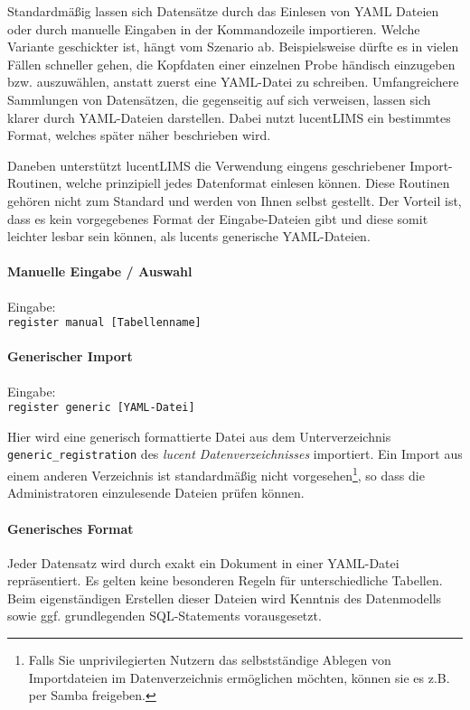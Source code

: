 Standardmäßig lassen sich Datensätze durch das Einlesen von YAML Dateien oder durch manuelle Eingaben in der Kommandozeile importieren.
Welche Variante geschickter ist, hängt vom Szenario ab.
Beispielsweise dürfte es in vielen Fällen schneller gehen, die Kopfdaten einer einzelnen Probe händisch einzugeben bzw. auszuwählen, anstatt zuerst eine YAML-Datei zu schreiben.
Umfangreichere Sammlungen von Datensätzen, die gegenseitig auf sich verweisen, lassen sich klarer durch YAML-Dateien darstellen.
Dabei nutzt lucentLIMS ein bestimmtes Format, welches später näher beschrieben wird.

\par

Daneben unterstützt lucentLIMS die Verwendung eingens geschriebener Import-Routinen, welche prinzipiell jedes Datenformat einlesen können.
Diese Routinen gehören nicht zum Standard und werden von Ihnen selbst gestellt.
Der Vorteil ist, dass es kein vorgegebenes Format der Eingabe-Dateien gibt und diese somit leichter lesbar sein können, als lucents generische YAML-Dateien.

\paragraph{Manuelle Eingabe / Auswahl}

Eingabe: \\
\texttt{register manual [Tabellenname]}


\paragraph{Generischer Import}

Eingabe: \\
\texttt{register generic [YAML-Datei]}

\par

Hier wird eine generisch formattierte Datei aus dem Unterverzeichnis \texttt{generic\_registration} des \textit{lucent Datenverzeichnisses} importiert.
Ein Import aus einem anderen Verzeichnis ist standardmäßig nicht vorgesehen\footnote{Falls Sie unprivilegierten Nutzern das selbstständige Ablegen von Importdateien im Datenverzeichnis ermöglichen möchten, können sie es z.B. per Samba freigeben.}, so dass die Administratoren einzulesende Dateien prüfen können.

\paragraph{Generisches Format}
Jeder Datensatz wird durch exakt ein Dokument in einer YAML-Datei repräsentiert.
Es gelten keine besonderen Regeln für unterschiedliche Tabellen.
Beim eigenständigen Erstellen dieser Dateien wird Kenntnis des Datenmodells sowie ggf. grundlegenden SQL-Statements vorausgesetzt.

